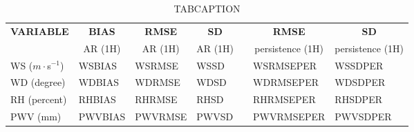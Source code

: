 \begin{table}[]
\begin{center}
\begin{tabular}{|l|l|l|l|l|l|l|}
\hline
\multicolumn{1}{|c|}{\cellcolor[HTML]{C0C0C0}\textbf{VARIABLE}} & \multicolumn{1}{c|}{\cellcolor[HTML]{C0C0C0}\textbf{BIAS}} & \multicolumn{1}{c|}{\cellcolor[HTML]{C0C0C0}\textbf{RMSE}} & \multicolumn{1}{c|}{\cellcolor[HTML]{C0C0C0}\textbf{SD}} & & \multicolumn{1}{c|}{\cellcolor[HTML]{C0C0C0}\textbf{RMSE}} & \multicolumn{1}{c|}{\cellcolor[HTML]{C0C0C0}\textbf{SD}}\\
\multicolumn{1}{|c|}{\cellcolor[HTML]{C0C0C0}} & \multicolumn{1}{c|}{\cellcolor[HTML]{C0C0C0}AR (1H)} & \multicolumn{1}{c|}{\cellcolor[HTML]{C0C0C0}AR (1H)} & \multicolumn{1}{c|}{\cellcolor[HTML]{C0C0C0}AR (1H)} & & \multicolumn{1}{c|}{\cellcolor[HTML]{C0C0C0} persistence (1H)} & \multicolumn{1}{c|}{\cellcolor[HTML]{C0C0C0}persistence (1H)}\\\hline
\cellcolor[HTML]{C0C0C0}WS ($m\cdot$s$^{-1}$) & WSBIAS  & WSRMSE  & WSSD  & & WSRMSEPER  & WSSDPER\\
\cellcolor[HTML]{C0C0C0}WD (degree)           & WDBIAS  & WDRMSE  & WDSD  & & WDRMSEPER  & WDSDPER\\
\cellcolor[HTML]{C0C0C0}RH (percent)          & RHBIAS  & RHRMSE  & RHSD  & & RHRMSEPER  & RHSDPER\\
\cellcolor[HTML]{C0C0C0}PWV (mm)              & PWVBIAS & PWVRMSE & PWVSD & & PWVRMSEPER & PWVSDPER\\
\hline
\end{tabular}
\caption{TABCAPTION}\label{MYLABEL}
\end{center}
\end{table}

